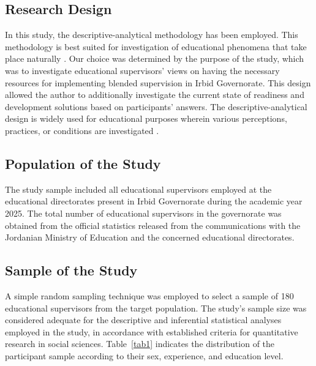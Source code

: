 \documentclass[10pt]{NSP1}
\begin{document}
\subsection{Research Design}

In this study, the descriptive-analytical methodology has been employed. This methodology is best suited for investigation of educational phenomena that take place naturally \cite{ref31}. Our choice was determined by the purpose of the study, which was to investigate educational supervisors' views on having the necessary resources for implementing blended supervision in Irbid Governorate. This design allowed the author to additionally investigate the current state of readiness and development solutions based on participants' answers. The descriptive-analytical design is widely used for educational purposes wherein various perceptions, practices, or conditions are investigated \cite{ref32}.

\subsection{Population of the Study}

The study sample included all educational supervisors employed at the educational directorates present in Irbid Governorate during the academic year 2025. The total number of educational supervisors in the governorate was obtained from the official statistics released from the communications with the Jordanian Ministry of Education and the concerned educational directorates.

\subsection{Sample of the Study}

A simple random sampling technique was employed to select a sample of 180 educational supervisors from the target population. The study's sample size was considered adequate for the descriptive and inferential statistical analyses employed in the study, in accordance with established criteria for quantitative research in social sciences. Table~\ref{tab1} indicates the distribution of the participant sample according to their sex, experience, and education level.

\clearpage
\end{document}
